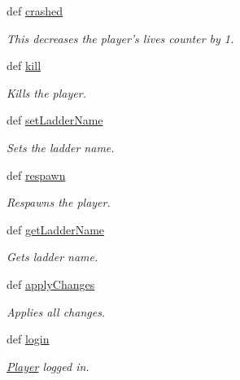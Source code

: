\begin{DoxyCompactItemize}
def \hyperlink{class_player_1_1_player_aa3399eb13837ea4756060474fdf81e19}{crashed}
\begin{DoxyCompactList}\small\item\em This decreases the player's lives counter by 1. \item\end{DoxyCompactList}\item 
def \hyperlink{class_player_1_1_player_a4513fc3191aa1b2da9ebac05acb67642}{kill}
\begin{DoxyCompactList}\small\item\em Kills the player. \item\end{DoxyCompactList}\item 
def \hyperlink{class_player_1_1_player_add4b61d7f63f7361bdaa2e797cc00567}{setLadderName}
\begin{DoxyCompactList}\small\item\em Sets the ladder name. \item\end{DoxyCompactList}\item 
def \hyperlink{class_player_1_1_player_ad32410beb56cd2b6d3ab69568a5a3f7d}{respawn}
\begin{DoxyCompactList}\small\item\em Respawns the player. \item\end{DoxyCompactList}\item 
def \hyperlink{class_player_1_1_player_a9dfc04a9bc137d223ea2bf2eea0b04d3}{getLadderName}
\begin{DoxyCompactList}\small\item\em Gets ladder name. \item\end{DoxyCompactList}\item 
def \hyperlink{class_player_1_1_player_aff01af86018e0aff6fe8c5ff01d46d0a}{applyChanges}
\begin{DoxyCompactList}\small\item\em Applies all changes. \item\end{DoxyCompactList}\item 
def \hyperlink{class_player_1_1_player_a191891bb93599c4edc1bae029966d6cd}{login}
\begin{DoxyCompactList}\small\item\em \hyperlink{class_player_1_1_player}{Player} logged in. \item\end{DoxyCompactList}\item 

\end{DoxyCompactItemize}
